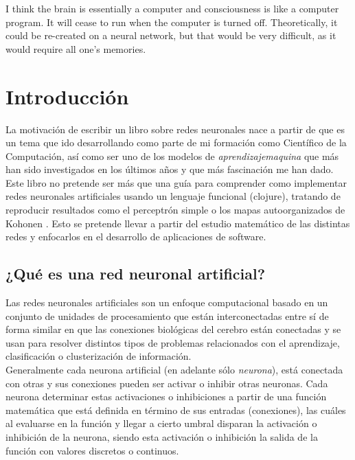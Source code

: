 \begin{savequote}[72mm]

I think the brain is essentially a computer and consciousness is like
a computer program. It will cease to run when the computer is turned
off. Theoretically, it could be re-created on a neural network, but
that would be very difficult, as it would require all one's memories.

\end{savequote}

\chapter{Introducción}
\label{cha:Introducción}

\graphicspath{{1_introduction/images/}}

La motivación de escribir un libro sobre redes neuronales nace a
partir de que es un tema que ido desarrollando como parte de mi
formación como Científico de la Computación, así como ser uno de los
modelos de \textsl{\gls{aprendizajemaquina}} que más han sido
investigados en los últimos años y que más fascinación me han dado.\\

Este libro no pretende ser más que una guía para comprender como
implementar redes neuronales artificiales usando un lenguaje funcional
(\gls{clojure}), tratando de reproducir resultados como el perceptrón
simple \cite{rosenblatt1958perceptron} o los mapas autoorganizados de
Kohonen \cite{kohonen1982som, Kohonen2001}. Esto se pretende llevar a
partir del estudio matemático de las distintas redes y enfocarlos en
el desarrollo de aplicaciones de software.

\section{¿Qué es una red neuronal artificial?}

Las redes neuronales artificiales son un enfoque computacional basado
en un conjunto de unidades de procesamiento que están interconectadas
entre sí de forma similar en que las conexiones biológicas del cerebro
están conectadas y se usan para resolver distintos tipos de problemas
relacionados con el aprendizaje, clasificación o clusterización de
información.\\

Generalmente cada neurona artificial (en adelante sólo
\textit{neurona}), está conectada con otras y sus conexiones pueden
ser activar o inhibir otras neuronas. Cada neurona determinar estas
activaciones o inhibiciones a partir de una función matemática que
está definida en término de sus entradas (conexiones), las cuáles al
evaluarse en la función y llegar a cierto umbral disparan la
activación o inhibición de la neurona, siendo esta activación o
inhibición la salida de la función con valores discretos o continuos.\\

